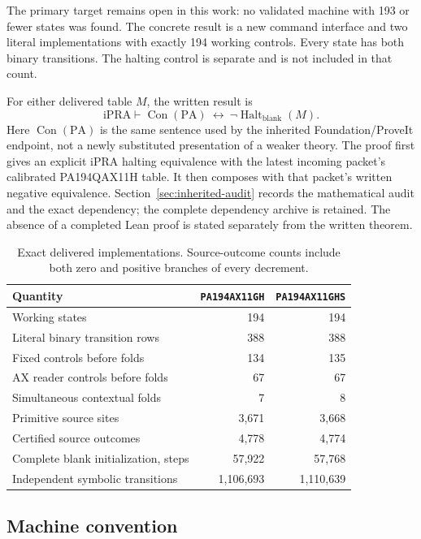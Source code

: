 \documentclass[10pt,a4paper]{article}
\newcommand{\ipra}{\mathrm{iPRA}}
\newcommand{\PA}{\mathrm{PA}}
\newcommand{\Con}{\operatorname{Con}}
\newcommand{\Halt}{\operatorname{Halt}}
\newcommand{\GH}{\texttt{PA194AX11GH}}
\newcommand{\GHS}{\texttt{PA194AX11GHS}}
\begin{document}
The primary target remains open in this work: no validated machine with
193 or fewer states was found. The concrete result is a new command
interface and two literal implementations with exactly 194 working
controls. Every state has both binary transitions. The halting control
is separate and is not included in that count.

For either delivered table $M$, the written result is
\[
 \ipra\vdash \Con(\PA)\ \longleftrightarrow\
                    \neg\Halt_{\mathrm{blank}}(M).
\]
Here $\Con(\PA)$ is the same  sentence used
by the inherited Foundation/ProveIt endpoint, not a newly substituted
presentation of a weaker theory. The proof first gives an explicit
iPRA halting equivalence with the latest incoming packet's calibrated
PA194QAX11H table. It then composes with that packet's written negative
equivalence. Section~\ref{sec:inherited-audit} records the mathematical
audit and the exact dependency; the complete dependency archive is
retained. The absence of a completed Lean proof is stated separately
from the written theorem.

\begin{table}[ht]
\centering
\begin{tabular}{lrr}
\toprule
Quantity & \GH & \GHS\\
\midrule
Working states & 194 & 194\\
Literal binary transition rows & 388 & 388\\
Fixed controls before folds & 134 & 135\\
AX reader controls before folds & 67 & 67\\
Simultaneous contextual folds & 7 & 8\\
Primitive source sites & 3,671 & 3,668\\
Certified source outcomes & 4,778 & 4,774\\
Complete blank initialization, steps & 57,922 & 57,768\\
Independent symbolic transitions & 1,106,693 & 1,110,639\\
\bottomrule
\end{tabular}
\caption{Exact delivered implementations. Source-outcome counts include
both zero and positive branches of every decrement.}
\label{tab:results}
\end{table}

\subsection{Machine convention}
\end{document}
